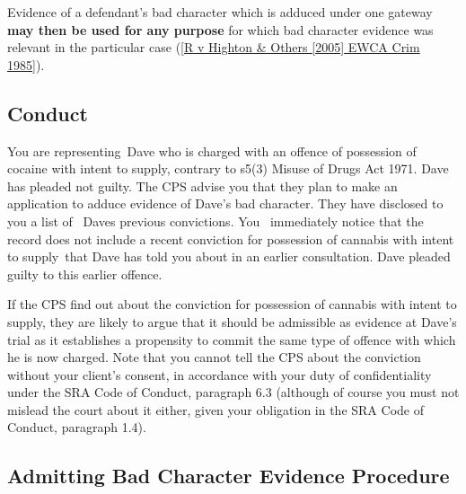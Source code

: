 \documentclass[
]{article}
\newenvironment{Shaded}{}{}
\newcommand{\NormalTok}[1]{#1}
\begin{document}
Evidence of a defendant's bad character which is adduced under one
gateway \textbf{may then be used for any purpose} for which bad
character evidence was relevant in the particular case
(\href{judges\%20should\%20apply\%20the\%20provisions\%20of\%20s\%2078\%20when\%20making\%20rulings\%20as\%20to\%20the\%20use\%20of\%20evidence\%20of\%20bad\%20character,\%20and\%20exclude\%20evidence\%20where\%20it\%20would\%20be\%20appropriate\%20to\%20do\%20so\%20under\%20s\%2078.}{{[}R
v Highton \& Others {[}2005{]} EWCA Crim 1985{]}}).

\hypertarget{conduct}{%
\subsection{Conduct}\label{conduct}}

\begin{Shaded}
\begin{Highlighting}[]
\NormalTok{You are representing Dave who is charged with an offence of possession of cocaine with intent to supply, contrary to s5(3) Misuse of Drugs Act 1971. Dave has pleaded not guilty. The CPS advise you that they plan to make an application to adduce evidence of Dave’s bad character. They have disclosed to you a list of  Dave\textquotesingle{}s previous convictions. You  immediately notice that the record does not include a recent conviction for possession of cannabis with intent to supply that Dave has told you about in an earlier consultation. Dave pleaded guilty to this earlier offence.}
\end{Highlighting}
\end{Shaded}

If the CPS find out about the conviction for possession of cannabis with
intent to supply, they are likely to argue that it should be admissible
as evidence at Dave's trial as it establishes a propensity to commit the
same type of offence with which he is now charged. Note that you cannot
tell the CPS about the conviction without your client's consent, in
accordance with your duty of confidentiality under the SRA Code of
Conduct, paragraph 6.3 (although of course you must not mislead the
court about it either, given your obligation in the SRA Code of Conduct,
paragraph 1.4).

\hypertarget{admitting-bad-character-evidence-procedure}{%
\subsection{Admitting Bad Character Evidence
Procedure}\label{admitting-bad-character-evidence-procedure}}
\end{document}
